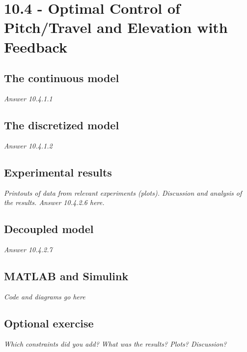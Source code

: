 \section{10.4 - Optimal Control of Pitch/Travel and Elevation with Feedback}

\subsection{The continuous model}
\textit{Answer 10.4.1.1}

\subsection{The discretized model}
\textit{Answer 10.4.1.2}

\subsection{Experimental results}
\textit{Printouts of data from relevant experiments (plots).
Discussion and analysis of the results.
Answer 10.4.2.6 here.}

\subsection{Decoupled model}
\textit{Answer 10.4.2.7}

\subsection{MATLAB and Simulink}
\textit{Code and diagrams go here}

\subsection{Optional exercise}
\textit{Which constraints did you add? What was the results? Plots? Discussion?}
	
	
	
	
	
	
	
	
	
	
	
	
	 
	
